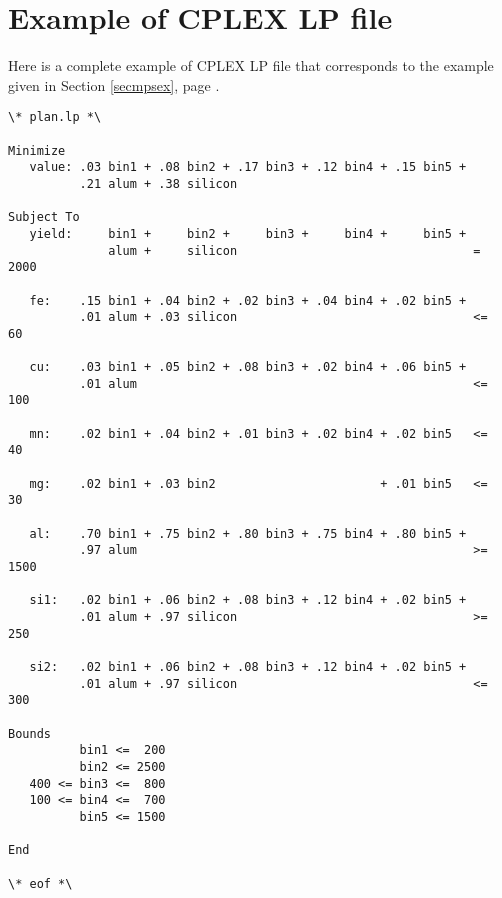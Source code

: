 \section{Example of CPLEX LP file}

Here is a complete example of CPLEX LP file that corresponds to the
example given in Section \ref{secmpsex}, page \pageref{secmpsex}.

\medskip

\begin{footnotesize}
\begin{verbatim}
\* plan.lp *\

Minimize
   value: .03 bin1 + .08 bin2 + .17 bin3 + .12 bin4 + .15 bin5 +
          .21 alum + .38 silicon

Subject To
   yield:     bin1 +     bin2 +     bin3 +     bin4 +     bin5 +
              alum +     silicon                                 =  2000

   fe:    .15 bin1 + .04 bin2 + .02 bin3 + .04 bin4 + .02 bin5 +
          .01 alum + .03 silicon                                 <=   60

   cu:    .03 bin1 + .05 bin2 + .08 bin3 + .02 bin4 + .06 bin5 +
          .01 alum                                               <=  100

   mn:    .02 bin1 + .04 bin2 + .01 bin3 + .02 bin4 + .02 bin5   <=   40

   mg:    .02 bin1 + .03 bin2                       + .01 bin5   <=   30

   al:    .70 bin1 + .75 bin2 + .80 bin3 + .75 bin4 + .80 bin5 +
          .97 alum                                               >= 1500

   si1:   .02 bin1 + .06 bin2 + .08 bin3 + .12 bin4 + .02 bin5 +
          .01 alum + .97 silicon                                 >=  250

   si2:   .02 bin1 + .06 bin2 + .08 bin3 + .12 bin4 + .02 bin5 +
          .01 alum + .97 silicon                                 <=  300

Bounds
          bin1 <=  200
          bin2 <= 2500
   400 <= bin3 <=  800
   100 <= bin4 <=  700
          bin5 <= 1500

End

\* eof *\
\end{verbatim}
\end{footnotesize}

